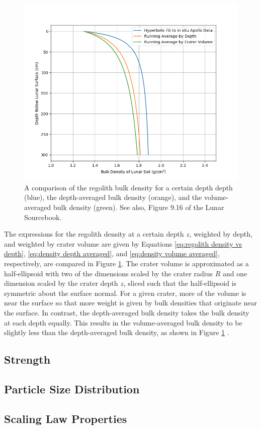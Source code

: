 \documentclass{article}
\begin{document}
\begin{figure}[h!]
	\centering
	\includegraphics[width=\linewidth]{regolith_density_vs_depth.png}
	\caption{A comparison of the regolith bulk density for a certain depth depth (blue), the depth-averaged bulk density (orange), and the volume-averaged bulk density (green). See also, Figure 9.16 of the Lunar Sourcebook.}
	\label{fig:regolith_density_vs_depth}
\end{figure}


The expressions for the regolith density at a certain depth $z$, weighted by depth, and weighted by crater volume are given by Equations \eqref{eq:regolith density vs depth}, \eqref{eq:density depth averaged}, and \eqref{eq:density volume averaged}, respectively, are compared in Figure \ref{fig:regolith_density_vs_depth}. The crater volume is approximated as a half-ellipsoid with two of the dimensions scaled by the crater radius $R$ and one dimension scaled by the crater depth $z$, sliced such that the half-ellipsoid is symmetric about the surface normal. For a given crater, more of the volume is near the surface so that more weight is given by bulk densities that originate near the surface. In contrast, the depth-averaged bulk density takes the bulk density at each depth equally. This results in the volume-averaged bulk density to be slightly less than the depth-averaged bulk density, as shown in Figure \ref{fig:regolith_density_vs_depth}
.



\subsection{Strength}


\subsection{Particle Size Distribution}


\subsection{Scaling Law Properties}
\end{document}
